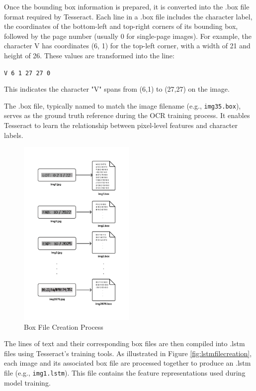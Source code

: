 Once the bounding box information is prepared, it is converted into the .box file format required by Tesseract. Each line in a .box file includes the character label, the coordinates of the bottom-left and top-right corners of its bounding box, followed by the page number (usually 0 for single-page images). For example, the character V has coordinates (6, 1) for the top-left corner, with a width of 21 and height of 26. These values are transformed into the line:
\begin{center}
\texttt{V 6 1 27 27 0}
\end{center}
This indicates the character "V" spans from (6,1) to (27,27) on the image.

The .box file, typically named to match the image filename (e.g., \texttt{img35.box}), serves as the ground truth reference during the OCR training process. It enables Tesseract to learn the relationship between pixel-level features and character labels.
\begin{figure}[H]
\centering
\includegraphics[width=0.5\textwidth]{Figures/Chapter 3/Box_File_Creation.png}
\caption{Box File Creation Process}
\label{fig:boxfilecreation}
\end{figure}

The lines of text and their corresponding box files are then compiled into .lstm files using Tesseract’s training tools. As illustrated in Figure \ref{fig:lstmfilecreation}, each image and its associated box file are processed together to produce an .lstm file (e.g., \texttt{img1.lstm}). This file contains the feature representations used during model training.
    

